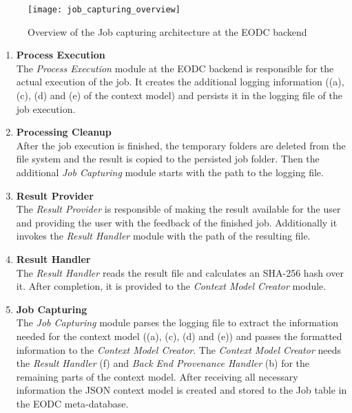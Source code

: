 \documentclass[draft,final]{vutinfth} %
\begin{document}
\begin{figure}[h]
	\centering
	\texttt{[image: job\_capturing\_overview]}
	\caption{Overview of the Job capturing architecture at the EODC backend}
	\label{fig:impljobcapture} %
\end{figure}

\begin{enumerate}
	\item \textbf{Process Execution} \\
	The \textit{Process Execution} module at the EODC backend is responsible for the actual execution of the job. It creates the additional logging information ((a), (c), (d) and (e) of the context model) and persists it in the logging file of the job execution. 
	\item \textbf{Processing Cleanup} \\
	After the job execution is finished, the temporary folders are deleted from the file system and the result is copied to the persisted job folder. Then the additional \textit{Job Capturing} module starts with the path to the logging file.  
	\item \textbf{Result Provider} \\
	The \textit{Result Provider} is responsible of making the result available for the user and providing the user with the feedback of the finished job. Additionally it invokes the \textit{Result Handler} module with the path of the resulting file.
	\item \textbf{Result Handler} \\
	The \textit{Result Handler} reads the result file and calculates an SHA-256 hash over it. After completion, it is provided to the \textit{Context Model Creator} module.  
	\item \textbf{Job Capturing} \\
	The \textit{Job Capturing} module parses the logging file to extract the information needed for the context model ((a), (c), (d) and (e)) and passes the formatted information to the \textit{Context Model Creator}. The \textit{Context Model Creator} needs the \textit{Result Handler} (f) and \textit{Back End Provenance Handler} (b) for the remaining parts of the context model. After receiving all necessary information the JSON context model is created and stored to the Job table in the EODC meta-database.    
\end{enumerate}
\end{document}
